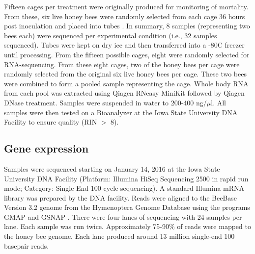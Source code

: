 \documentclass{bmcart}
\begin{document}
\begin{linenumbers}
\begin{doublespacing}
Fifteen cages per treatment were originally produced for monitoring of mortality. From these, six live honey bees were randomly selected from each cage 36 hours post inoculation and placed into tubes \cite{carrillo}. In summary, 8 samples (representing two bees each) were sequenced per experimental condition (i.e., 32 samples sequenced). Tubes were kept on dry ice and then transferred into a -80C freezer until processing. From the fifteen possible cages, eight were randomly selected for RNA-sequencing. From these eight cages, two of the honey bees per cage were randomly selected from the original six live honey bees per cage. These two bees were combined to form a pooled sample representing the cage. Whole body RNA from each pool was extracted using Qiagen RNeasy MiniKit followed by Qiagen DNase treatment. Samples were suspended in water to 200-400 ng/$\mu$l. All samples were then tested on a Bioanalyzer at the Iowa State University DNA Facility to ensure quality (RIN $>$ 8).

\subsection*{Gene expression}

Samples were sequenced starting on January 14, 2016 at the Iowa State University DNA Facility (Platform: Illumina HiSeq Sequencing 2500 in rapid run mode; Category: Single End 100 cycle sequencing). A standard Illumina mRNA library was prepared by the DNA facility. Reads were aligned to the BeeBase Version 3.2 genome \cite{hbGenome} from the Hymenoptera Genome Database \cite{hymenopteraDB} using the programs GMAP and GSNAP \cite{gsnap}. There were four lanes of sequencing with 24 samples per lane. Each sample was run twice. Approximately 75-90\% of reads were mapped to the honey bee genome. Each lane produced around 13 million single-end 100 basepair reads.


\end{doublespacing}
\end{linenumbers}
\end{document}
